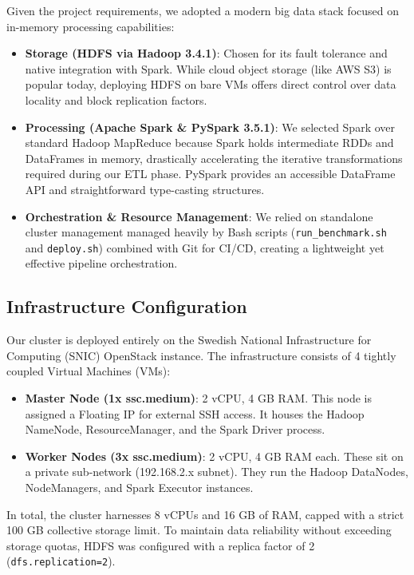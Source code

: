Given the project requirements, we adopted a modern big data stack focused on in-memory processing capabilities:
\begin{itemize}
    \item \textbf{Storage (HDFS via Hadoop 3.4.1)}: Chosen for its fault tolerance and native integration with Spark. While cloud object storage (like AWS S3) is popular today, deploying HDFS on bare VMs offers direct control over data locality and block replication factors.
    \item \textbf{Processing (Apache Spark \& PySpark 3.5.1)}: We selected Spark over standard Hadoop MapReduce because Spark holds intermediate RDDs and DataFrames in memory, drastically accelerating the iterative transformations required during our ETL phase. PySpark provides an accessible DataFrame API and straightforward type-casting structures.
    \item \textbf{Orchestration \& Resource Management}: We relied on standalone cluster management managed heavily by Bash scripts (\texttt{run\_benchmark.sh} and \texttt{deploy.sh}) combined with Git for CI/CD, creating a lightweight yet effective pipeline orchestration.
\end{itemize}

\subsection{Infrastructure Configuration}
\label{subsec:infra}

Our cluster is deployed entirely on the Swedish National Infrastructure for Computing (SNIC) OpenStack instance. The infrastructure consists of 4 tightly coupled Virtual Machines (VMs):
\begin{itemize}
    \item \textbf{Master Node (1x ssc.medium)}: 2 vCPU, 4 GB RAM. This node is assigned a Floating IP for external SSH access. It houses the Hadoop NameNode, ResourceManager, and the Spark Driver process.
    \item \textbf{Worker Nodes (3x ssc.medium)}: 2 vCPU, 4 GB RAM each. These sit on a private sub-network (192.168.2.x subnet). They run the Hadoop DataNodes, NodeManagers, and Spark Executor instances.
\end{itemize}
In total, the cluster harnesses 8 vCPUs and 16 GB of RAM, capped with a strict 100 GB collective storage limit. To maintain data reliability without exceeding storage quotas, HDFS was configured with a replica factor of 2 (\texttt{dfs.replication=2}). 

